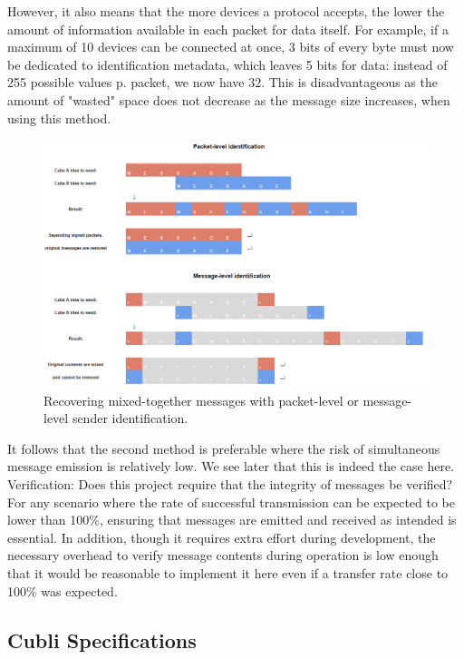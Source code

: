 However, it also means that the more devices a protocol accepts, the lower the amount of information available in each packet for data itself. For example, if a maximum of 10 devices can be connected at once, 3 bits of every byte must now be dedicated to identification metadata, which leaves 5 bits for data: instead of 255 possible values p. packet, we now have 32. This is disadvantageous as the amount of "wasted" space does not decrease as the message size increases, when using this method.\\

\begin{figure}[ht]
   \centering
   \includegraphics[width=1\textwidth]{img/disambiguation.png}
   \caption{Recovering mixed-together messages with packet-level or message-level sender identification.}
   \label{img:disambiguation}
\end{figure}

It follows that the second method is preferable where the risk of simultaneous message emission is relatively low. We see later that this is indeed the case here. \\


Verification: Does this project require that the integrity of messages be verified? For any scenario where the rate of successful transmission can be expected to be lower than 100\%, ensuring that messages are emitted and received as intended is essential. In addition, though it requires extra effort during development, the necessary overhead to verify message contents during operation is low enough that it would be reasonable to implement it here even if a transfer rate close to 100\% was expected.


\subsection{Cubli Specifications}

